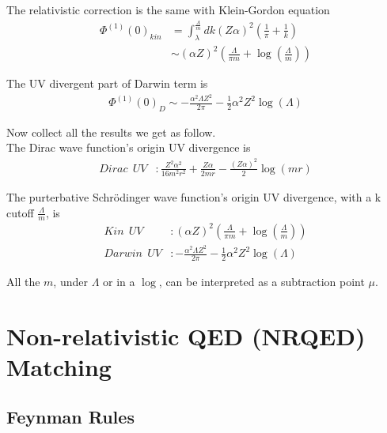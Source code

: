 \documentclass{article}
\renewcommand{\a}{\alpha}
\begin{document}
The relativistic correction is the same with Klein-Gordon equation
\begin{align}
	\Phi^{(1)}(0)_{kin} & =\int_\lambda^\frac{\Lambda}{m}dk(Z\alpha)^2(\frac{1}{\pi}+\frac{1}{k}) \\
	                    & \sim(\alpha Z)^2(\frac{\Lambda}{\pi m}+\log(\frac{\Lambda}{m}))
\end{align}

The UV divergent part of Darwin term is
\begin{align}
	\Phi^{(1)}(0)_D\sim-\frac{\alpha ^2 \Lambda  Z^2}{2 \pi }-\frac{1}{2} \alpha ^2 Z^2 \log (\Lambda )
\end{align}

Now collect all the results we get as follow.\\
The Dirac wave function's origin UV divergence is
\begin{align}
	Dirac\ \ UV & :\frac{Z^2\a^2}{16m^2r^2}+\frac{Z\a}{2mr}-\frac{(Z\alpha)^2}{2}\log(m r)
\end{align}

The purterbative Schr\"odinger wave function's origin UV divergence, with a k cutoff $\frac{\Lambda}{m}$, is
\begin{align}
	Kin\ \  UV    & :(\alpha Z)^2(\frac{\Lambda}{\pi m}+\log(\frac{\Lambda}{m}))                                         \\
	Darwin\ \  UV & :-\frac{\alpha ^2 \Lambda  Z^2}{2 \pi }-\frac{1}{2} \alpha ^2 Z^2 \log (\Lambda )
\end{align}

All the $m$, under $\Lambda$ or in a $\log$, can be interpreted as a subtraction point $\mu$.

\section{Non-relativistic QED (NRQED) Matching}
\subsection{Feynman Rules}
\end{document}

